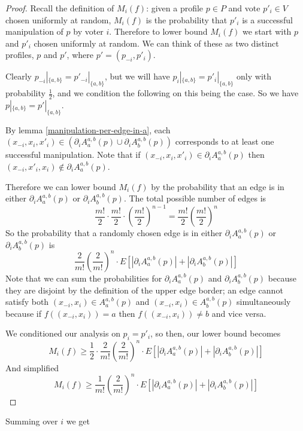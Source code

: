 	\begin{proof}
		Recall the definition of $M_i(f)$: given a profile $p \in P$ and vote $p'_i \in V$ chosen uniformly at random, $M_i(f)$ is the probability that $p'_i$ is a successful manipulation of $p$ by voter $i$. Therefore to lower bound $M_i(f)$ we start with $p$ and $p'_i$ chosen uniformly at random. We can think of these as two distinct profiles, $p$ and $p'$, where $p' = (p_{-i}, p'_i)$.

		Clearly $p_{-i}|_{\{a,b\}} = p'_{-i}|_{\{a,b\}}$, but we will have $p_i|_{\{a,b\}} = p'_i|_{\{a,b\}}$ only with probability $\frac{1}{2}$, and we condition the following on this being the case. So we have $p|_{\{a,b\}} = p'|_{\{a,b\}}$.

		By lemma \ref{manipulation-per-edge-in-a}, each $(x_{-i}, x_i, x'_i) \in (\partial_i A^{a,b}_a(p) \cup \partial_i A^{a,b}_b(p))$ corresponds to at least one successful manipulation. Note that if $(x_{-i}, x_i, x'_i) \in \partial_i A^{a,b}_a(p)$ then $(x_{-i}, x'_i, x_i) \notin \partial_i A^{a,b}_a(p)$.

		Therefore we can lower bound $M_i(f)$ by the probability that an edge is in either $\partial_i A^{a,b}_a(p)$ or $\partial_i A^{a,b}_b(p)$. The total possible number of edges is
		\[
			\frac{m!}{2} \cdot \frac{m!}{2} \cdot \left(\frac{m!}{2}\right)^{n-1} = \frac{m!}{2}\left(\frac{m!}{2}\right)^{n}
		\]
		So the probability that a randomly chosen edge is in either $\partial_i A^{a,b}_a(p)$ or $\partial_i A^{a,b}_b(p)$ is
		\[
			\frac{2}{m!} \left(\frac{2}{m!}\right)^{n} \cdot E \left[ |\partial_i A^{a,b}_a(p)| + |\partial_i A^{a,b}_b(p)| \right]
		\]
		Note that we can sum the probabilities for $\partial_i A^{a,b}_a(p)$ and $\partial_i A^{a,b}_b(p)$ because they are disjoint by the definition of the upper edge border; an edge cannot satisfy both $(x_{-i}, x_i) \in A^{a,b}_a(p)$ and $(x_{-i}, x_i) \in A^{a,b}_b(p)$ simultaneously because if $f((x_{-i}, x_i)) = a$ then $f((x_{-i}, x_i)) \ne b$ and vice versa.

		We conditioned our analysis on $p_i = p'_i$, so then, our lower bound becomes
		\[
			M_i(f) \ge \frac{1}{2} \cdot \frac{2}{m!}\left(\frac{2}{m!}\right)^{n} \cdot E \left[ |\partial_i A^{a,b}_a(p)| + |\partial_i A^{a,b}_b(p)| \right]
		\]
		And simplified
		\[
			M_i(f) \ge \frac{1}{m!}\left(\frac{2}{m!}\right)^{n} \cdot E \left[ |\partial_i A^{a,b}_a(p)| + |\partial_i A^{a,b}_b(p)| \right]
		\]
	\end{proof}

	Summing over $i$ we get

